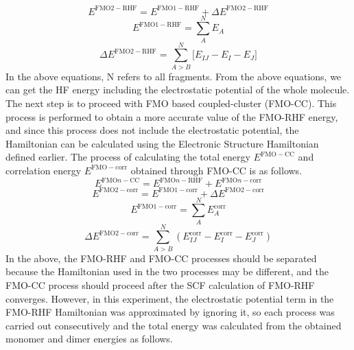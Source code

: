 \documentclass[pdflatex,sn-mathphys-num]{sn-jnl}%
\theoremstyle{thmstyleone}%
\theoremstyle{thmstyletwo}%
\theoremstyle{thmstylethree}%
\begin{document}
\begin{equation}
E^{\mathrm{FMO2\!-\!RHF}} = E^{\mathrm{FMO1\!-\!RHF}} + \Delta E^{\mathrm{FMO2\!-\!RHF}}
\end{equation}
\begin{equation}
E^{\mathrm{FMO1\!-\!RHF}} = \sum_{A}^{N} E_A
\end{equation}
\begin{equation}
\Delta E^{\mathrm{FMO2\!-\!RHF}} = \sum_{A > B}^{N} \Big[ E_{IJ} - E_I - E_J \Big]
\end{equation}
In the above equations, N refers to all fragments. From the above equations, we can get the HF energy including the electrostatic potential of the whole molecule. The next step is to proceed with FMO based coupled-cluster (FMO-CC). This process is performed to obtain a more accurate value of the FMO-RHF energy, and since this process does not include the electrostatic potential, the Hamiltonian can be calculated using the Electronic Structure Hamiltonian defined earlier. The process of calculating the total energy \(E^\mathrm{FMO-CC}\) and correlation energy \(E^\mathrm{FMO-corr}\) obtained through FMO-CC is as follows.
\begin{equation}
E^{\mathrm{FMO}n\!-\!\mathrm{CC}} = E^{\mathrm{FMO}n\!-\!\mathrm{RHF}} + E^{\mathrm{FMO}n\!-\!\mathrm{corr}}
\end{equation}
\begin{equation}
E^{\mathrm{FMO2\!-\!corr}} = E^{\mathrm{FMO1\!-\!corr}} + \Delta E^{\mathrm{FMO2\!-\!corr}}
\end{equation}
\begin{equation}
E^{\mathrm{FMO1\!-\!corr}} = \sum_{A}^{N} E_A^{\mathrm{corr}}
\end{equation}
\begin{equation}
\Delta E^{\mathrm{FMO2\!-\!corr}} = \sum_{A>B}^{N} 
\left( E_{IJ}^{\mathrm{corr}} - E_I^{\mathrm{corr}} - E_J^{\mathrm{corr}} \right)
\end{equation}
In the above, the FMO-RHF and FMO-CC processes should be separated because the Hamiltonian used in the two processes may be different, and the FMO-CC process should proceed after the SCF calculation of FMO-RHF converges. However, in this experiment, the electrostatic potential term in the FMO-RHF Hamiltonian was approximated by ignoring it, so each process was carried out consecutively and the total energy was calculated from the obtained monomer and dimer energies as follows.
\end{document}
